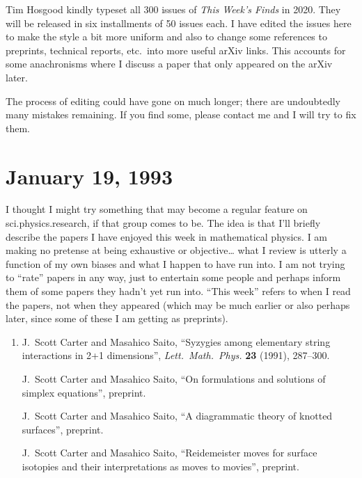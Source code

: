 \documentclass[12pt]{article}
\begin{document}
Tim Hosgood kindly typeset all 300 issues of \emph{This Week's Finds} in 2020. They
will be released in six installments of 50 issues each.  I have edited the issues here
to make the style a bit more uniform and also to change some references to preprints,
technical reports, etc.\ into more useful arXiv links.  This accounts for some anachronisms
where I discuss a paper that only appeared on the arXiv later.   

The process of editing could have gone on much longer; there are undoubtedly many 
mistakes remaining.  If you find some, please contact me and I will try to fix them.

\tableofcontents

\hypertarget{week1}{%
\section{January 19, 1993}\label{week1}}

I thought I might try something that may become a regular feature on
sci.physics.research, if that group comes to be. The idea is
that I'll briefly describe the papers I have enjoyed this week in
mathematical physics. I am making no pretense at being exhaustive or
objective\ldots{} what I review is utterly a function of my own biases
and what I happen to have run into. I am not trying to ``rate'' papers
in any way, just to entertain some people and perhaps inform them of
some papers they hadn't yet run into. ``This week'' refers to when I
read the papers, not when they appeared (which may be much earlier or
also perhaps later, since some of these I am getting as preprints).

\begin{enumerate}
\def\labelenumi{\arabic{enumi})}
\item
  J.\ Scott Carter and Masahico Saito, ``Syzygies among elementary string 
  interactions in 2+1 dimensions'', \emph{Lett.\ Math.\ Phys.}
  \textbf{23} (1991), 287--300.

  J.\ Scott Carter and Masahico Saito, ``On formulations and solutions of simplex equations'', preprint.

  J.\ Scott Carter and Masahico Saito, ``A diagrammatic theory of knotted surfaces'', preprint.

 J.\ Scott Carter and Masahico Saito, ``Reidemeister moves for surface isotopies and their interpretations as moves to movies'', preprint.
\end{enumerate}
\end{document}
